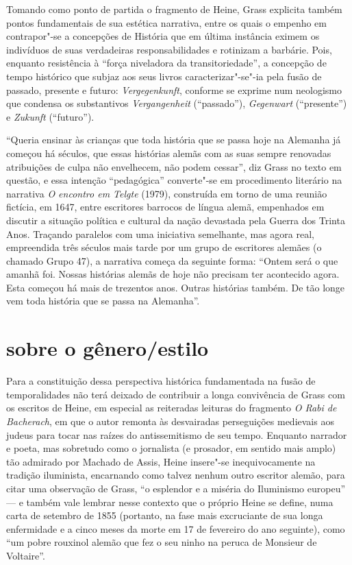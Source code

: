 Tomando como ponto de partida o fragmento de Heine, Grass explicita
também pontos fundamentais de sua estética narrativa, entre os quais o
empenho em contrapor"-se a concepções de História que em última
instância eximem os indivíduos de suas verdadeiras responsabilidades e
rotinizam a barbárie. Pois, enquanto resistência à “força niveladora da
transitoriedade”, a concepção de tempo histórico que subjaz aos seus
livros caracterizar"-se"-ia pela fusão de passado, presente e
futuro: \textit{Vergegenkunft}, conforme se exprime num neologismo que
condensa os substantivos \textit{Vergangenheit} (“passado”),
\textit{Gegenwart} (“presente”) e \textit{Zukunft} (“futuro”).

“Queria ensinar às crianças que toda história que se passa hoje na
Alemanha já começou há séculos, que essas histórias alemãs com as suas
sempre renovadas atribuições de culpa não envelhecem, não podem
cessar”, diz Grass no texto em questão, e essa intenção “pedagógica”
converte"-se em procedimento literário na narrativa \textit{O encontro
em Telgte} (1979), construída em torno de uma reunião fictícia, em
1647, entre escritores barrocos de língua alemã, empenhados em discutir
a situação política e cultural da nação devastada pela Guerra dos
Trinta Anos. Traçando paralelos com uma iniciativa semelhante, mas
agora real, empreendida três séculos mais tarde por um grupo de
escritores alemães (o chamado Grupo 47), a narrativa começa da seguinte
forma: “Ontem será o que amanhã foi. Nossas histórias alemãs de hoje
não precisam ter acontecido agora. Esta começou há mais de trezentos
anos. Outras histórias também. De tão longe vem toda história que se
passa na Alemanha”.

\section{sobre o gênero/estilo} %

 Para a constituição dessa perspectiva histórica fundamentada na fusão
de temporalidades não terá deixado de contribuir a longa convivência de
Grass com os escritos de Heine, em especial as reiteradas leituras do
fragmento \textit{O Rabi de Bacherach}, em que o autor remonta às
desvairadas perseguições medievais aos judeus para tocar nas raízes do
antissemitismo de seu tempo. Enquanto narrador e poeta, mas sobretudo
como o jornalista (e prosador, em sentido mais amplo) tão admirado por
Machado de Assis, Heine insere"-se inequivocamente na tradição
iluminista, encarnando como talvez nenhum outro escritor alemão, para
citar uma observação de Grass, “o esplendor e a miséria do Iluminismo
europeu” --- e também vale lembrar nesse contexto que o próprio Heine se
define, numa carta de setembro de 1855 (portanto, na fase mais
excruciante de sua longa enfermidade e a cinco meses da morte em 17 de
fevereiro do ano seguinte), como “um pobre rouxinol alemão que fez o
seu ninho na peruca de Monsieur de Voltaire”.

